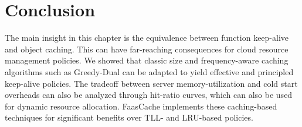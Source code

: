 

















\section{Conclusion}

The main insight in this chapter is the equivalence between function keep-alive and object caching.
This can have far-reaching consequences for cloud resource management policies.
We showed that classic size and frequency-aware caching algorithms such as Greedy-Dual can be adapted to yield effective and principled keep-alive policies.
The tradeoff between server memory-utilization and cold start overheads can also be analyzed through hit-ratio curves, which can also be used for dynamic resource allocation.
FaasCache implements these caching-based techniques for significant benefits over TLL- and LRU-based policies.

